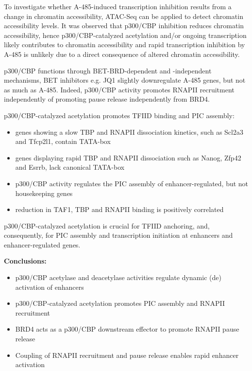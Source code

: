 To investigate whether A-485-induced transcription inhibition results from a change in chromatin accessibility, ATAC-Seq can be applied to detect chromatin accessibility levels. It was observed that p300/CBP inhibition reduces chromatin accessibility, hence p300/CBP-catalyzed acetylation and/or ongoing transcription likely contributes to chromatin accessibility and rapid transcription inhibition by A-485 is unlikely due to a direct consequence of altered chromatin accessibility.

p300/CBP functions through BET-BRD-dependent and -independent mechanisms, BET inhibitors e.g. JQ1 slightly downregulate A-485 genes, but not as much as A-485. Indeed, p300/CBP activity promotes RNAPII recruitment independently of promoting pause release independently from BRD4.

p300/CBP-catalyzed acetylation promotes TFIID binding and PIC assembly:
\begin{itemize}
\tightlist
\item genes showing a slow TBP and RNAPII dissociation kinetics, such as Scl2a3 and Tfcp2l1, contain
TATA-box
\item genes displaying rapid TBP and RNAPII dissociation such as Nanog, Zfp42 and Esrrb, lack
canonical TATA-box
\item p300/CBP activity regulates the PIC assembly of enhancer-regulated, but not housekeeping genes
\item reduction in TAF1, TBP and RNAPII binding is positively correlated
\end{itemize}

p300/CBP-catalyzed acetylation is crucial for TFIID anchoring, and, consequently, for PIC assembly and transcription initiation at enhancers and enhancer-regulated genes.

\textbf{Conclusions:}
\begin{itemize}
\tightlist
\item p300/CBP acetylase and deacetylase activities regulate dynamic (de) activation of enhancers
\item p300/CBP-catalyzed acetylation promotes PIC assembly and RNAPII recruitment
\item BRD4 acts as a p300/CBP downstream effector to promote RNAPII pause release
\item Coupling of RNAPII recruitment and pause release enables rapid enhancer activation
\end{itemize}

